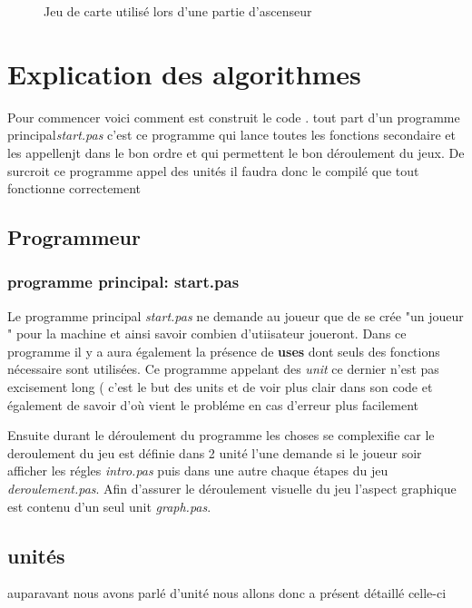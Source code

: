 \documentclass[12pt]{report}
\begin{document}
	\begin{figure}
	 \caption{Jeu de carte utilisé lors d'une partie d'ascenseur}
	\end{figure}
		

		
\clearpage

		
\section{Explication des algorithmes}
Pour commencer voici comment est construit le code . tout part d'un programme principal\textit{start.pas} c'est ce programme qui lance toutes les fonctions secondaire et  les appellenjt dans le bon ordre et  qui permettent le bon déroulement du jeux. De surcroit ce programme appel des unités il faudra donc le compilé que tout fonctionne correctement    
 \subsection{Programmeur}
  
   \subsubsection{programme principal: start.pas}
   Le programme principal \textit{start.pas} ne demande au joueur que de se crée "un joueur " pour la machine et ainsi savoir combien d'utiisateur joueront. Dans ce programme il y a aura également la présence de \textbf{uses} dont seuls des fonctions nécessaire sont utilisées. Ce programme appelant des \textit{unit} ce dernier n'est pas excisement long ( c'est le but des units et de voir plus clair dans son code et également de savoir  d'où vient le probléme en cas d'erreur plus facilement 
   
   Ensuite durant le déroulement du programme les choses se complexifie  car le deroulement  du jeu est définie dans 2 unité l'une demande si le joueur soir afficher les régles \textit{intro.pas}  puis dans une autre chaque étapes du jeu  \textit{deroulement.pas}. 
 Afin d'assurer le déroulement visuelle du jeu l'aspect graphique est contenu d'un seul unit \textit{graph.pas}.
   
   \subsection{unités}
    auparavant nous avons parlé d'unité nous allons donc a présent détaillé celle-ci
\end{document}

